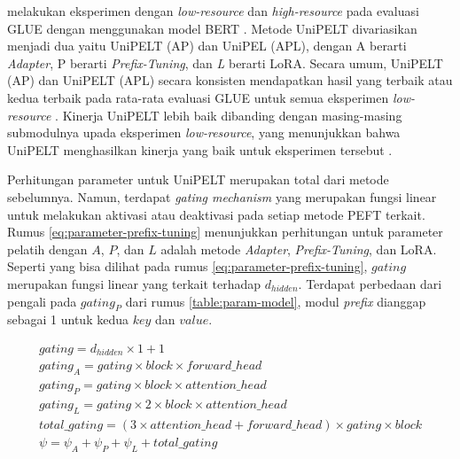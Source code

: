 \citeauthor{unipelt} melakukan eksperimen dengan \textit{low-resource} dan \textit{high-resource} pada evaluasi GLUE dengan menggunakan model BERT \parencite{unipelt}. Metode UniPELT divariasikan menjadi dua yaitu UniPELT (AP) dan UniPEL (APL), dengan A berarti \textit{Adapter}, P berarti \textit{Prefix-Tuning}, dan \textit{L} berarti LoRA. Secara umum, UniPELT (AP) dan UniPELT (APL) secara konsisten mendapatkan hasil yang terbaik atau kedua terbaik pada rata-rata evaluasi GLUE untuk semua eksperimen \textit{low-resource} \parencite{unipelt}. Kinerja UniPELT lebih baik dibanding dengan masing-masing submodulnya upada eksperimen \textit{low-resource}, yang menunjukkan bahwa UniPELT menghasilkan kinerja yang baik untuk eksperimen tersebut \parencite{unipelt}.

Perhitungan parameter untuk UniPELT merupakan total dari metode sebelumnya. Namun, terdapat \textit{gating mechanism} yang merupakan fungsi linear untuk melakukan aktivasi atau deaktivasi pada setiap metode PEFT terkait. Rumus \ref{eq:parameter-prefix-tuning} menunjukkan perhitungan untuk parameter pelatih dengan $A$, $P$, dan $L$ adalah metode \textit{Adapter}, \textit{Prefix-Tuning}, dan LoRA. Seperti yang bisa dilihat pada rumus \ref{eq:parameter-prefix-tuning}, $gating$ merupakan fungsi linear yang terkait terhadap $d_{hidden}$. Terdapat perbedaan dari pengali pada $gating_{P}$ dari rumus \ref{table:param-model}, modul \textit{prefix} dianggap sebagai 1 untuk kedua $key$ dan $value$.

\begin{equation}
    \begin{aligned}
        gating = d_{hidden} \times 1 + 1 \\
        gating_{A} = gating \times block \times forward\_head \\
        gating_{P} = gating \times block \times attention\_head \\
        gating_{L} = gating \times 2 \times block \times attention\_head \\
        total\_gating = (3 \times attention\_head + forward\_head) \times gating \times block \\
        \psi = \psi_A + \psi_P + \psi_L + total\_gating
    \end{aligned}
    \label{eq:parameter-unipelt}
\end{equation}

